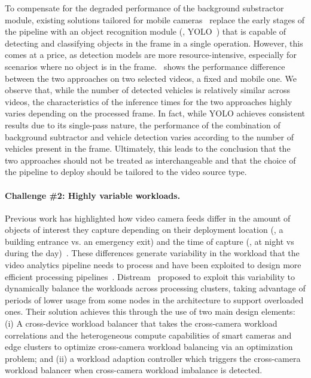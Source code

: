 To compensate for the degraded performance of the background substractor module, existing solutions tailored for mobile cameras~\cite{qiu2018kestrel,he2021real} replace the early stages of the pipeline with an object recognition module (\eg, YOLO~\cite{jocher2020yolov5}) that is capable of detecting and classifying objects in the frame in a single operation. However, this comes at a price, as detection models are more resource-intensive, especially for scenarios where no object is in the frame.~ shows the performance difference between the two approaches on two selected videos, a fixed and mobile one. We observe that, while the number of detected vehicles is relatively similar across videos, the characteristics of the inference times for the two approaches highly varies depending on the processed frame. In fact, while YOLO achieves consistent results due to its single-pass nature, the performance of the combination of background subtractor and vehicle detection varies according to the number of vehicles present in the frame. Ultimately, this leads to the conclusion that the two approaches should not be treated as interchangeable and that the choice of the pipeline to deploy should be tailored to the video source type.

\paragraph{Challenge \#2: Highly variable workloads.} 
Previous work has highlighted how video camera feeds differ in the amount of objects of interest they capture depending on their deployment location (\eg, a building entrance vs. an emergency exit) and the time of capture (\eg, at night vs during the day)~\cite{yildiz2013optimal,guo2021crossroi}. These differences generate variability in the workload that the video analytics pipeline needs to process and have been exploited to design more efficient processing pipelines~\cite{jiang2018chameleon,zeng2020distream}. Distream~\cite{zeng2020distream} proposed to exploit this variability to dynamically balance the workloads across processing clusters, taking advantage of periods of lower usage from some nodes in the architecture to support overloaded ones. Their solution achieves this through the use of two main design elements: (i) A cross-device workload balancer that takes the cross-camera workload correlations and the heterogeneous compute capabilities of smart cameras and edge clusters to optimize cross-camera workload balancing via an optimization problem; and (ii) a workload adaption controller which triggers the cross-camera workload balancer when cross-camera workload imbalance is detected. 

